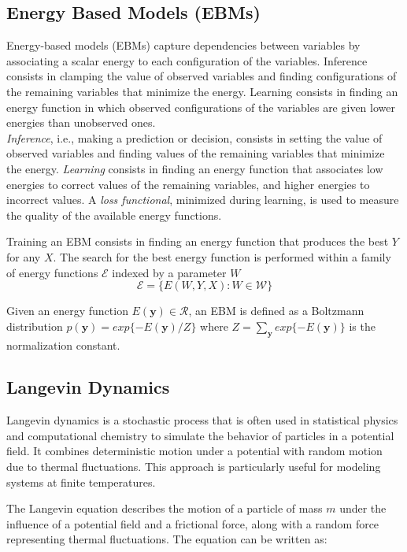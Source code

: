 \documentclass{article}
\begin{document}
\subsection{Energy Based Models (EBMs)} \cite[Predicting Structured Data]{Pred-structured-data}
Energy-based models (EBMs) capture dependencies between variables by associating a scalar energy to each conﬁguration of the variables. Inference consists in clamping the value of observed variables and ﬁnding conﬁgurations of the remaining
variables that minimize the energy. Learning consists in ﬁnding an energy function
in which observed conﬁgurations of the variables are given lower energies than
unobserved ones. \\
\textit{Inference}, i.e.,
making a prediction or decision, consists in setting the value of observed variables
and ﬁnding values of the remaining variables that minimize the energy. \textit{Learning}
consists in ﬁnding an energy function that associates low energies to correct values
of the remaining variables, and higher energies to incorrect values. A \textit{loss functional},
minimized during learning, is used to measure the quality of the available energy
functions.

Training an EBM consists in finding an energy function that produces the best $Y$
for any $X$. The search for the best energy function is performed within a family of
energy functions $\mathcal{E}$ indexed by a parameter $W$
$$\mathcal{E} = \{E(W,Y,X): W \in \mathcal{W}\}$$

Given an energy function $E(\boldsymbol{y}) \in \mathcal{R}$, an EBM is defined as a Boltzmann distribution $p(\boldsymbol{y}) = exp\{-E(\boldsymbol{y}) /Z\}$ where $Z = \sum_{\boldsymbol{y}} exp\{-E(\boldsymbol{y})\}$ is the normalization constant. \\

\subsection{Langevin Dynamics}
Langevin dynamics is a stochastic process that is often used in statistical physics and computational chemistry to simulate the behavior of particles in a potential field. It combines deterministic motion under a potential with random motion due to thermal fluctuations. This approach is particularly useful for modeling systems at finite temperatures.

The Langevin equation describes the motion of a particle of mass \( m \) under the influence of a potential field and a frictional force, along with a random force representing thermal fluctuations. The equation can be written as:
\end{document}
